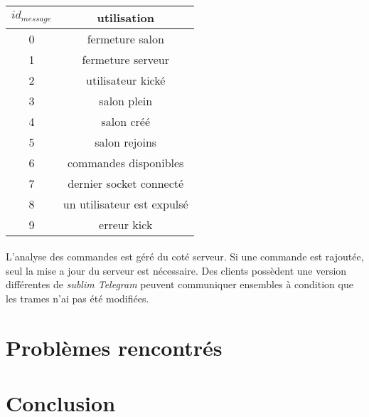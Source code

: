 \documentclass[a4paper, 12pt]{article}
\begin{document}
\paragraph{}
\begin{tabular}{|c|c|}
 \hline		
    $id_{message}$ & utilisation \\
 \hline		
    0 & fermeture salon \\
 \hline  
 	1 & fermeture serveur \\
 \hline
 	2 & utilisateur kické \\
 \hline
 	3 & salon plein \\
 \hline
 	4 & salon créé \\
 \hline
 	5 & salon rejoins \\
 \hline
    6 & commandes disponibles \\
 \hline
 	7 & dernier socket connecté \\
 \hline
 	8 & un utilisateur est expulsé \\
 \hline
    9 & erreur kick \\
 \hline
\end{tabular}
\paragraph{}
L'analyse des commandes est géré du coté serveur. Si une commande est rajoutée, seul la mise a jour du serveur est nécessaire. Des clients possèdent une version différentes de \emph{sublim Telegram} peuvent communiquer ensembles à condition que les trames n'ai pas été modifiées.
\section{Problèmes rencontrés}

\section{Conclusion}
\end{document}
